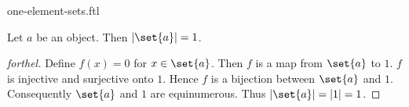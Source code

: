 \documentclass{naproche-library}
\begin{document}
\begin{smodule}[title=$1$-Element Sets]{one-element-sets.ftl}

\begin{proposition}[forthel,id=SET_THEORY_07_836893598023680]
  Let $a$ be an object.
  Then $|\set{a}| = 1$.
\end{proposition}
\begin{proof}[forthel]
  Define $f(x) = 0$ for $x \in \set{a}$.
  Then $f$ is a map from $\set{a}$ to $1$.
  $f$ is injective and surjective onto $1$.
  Hence $f$ is a bijection between $\set{a}$ and $1$.
  Consequently $\set{a}$ and $1$ are equinumerous.
  Thus $|\set{a}| = |1| = 1$.
\end{proof}
\end{smodule}
\end{document}
